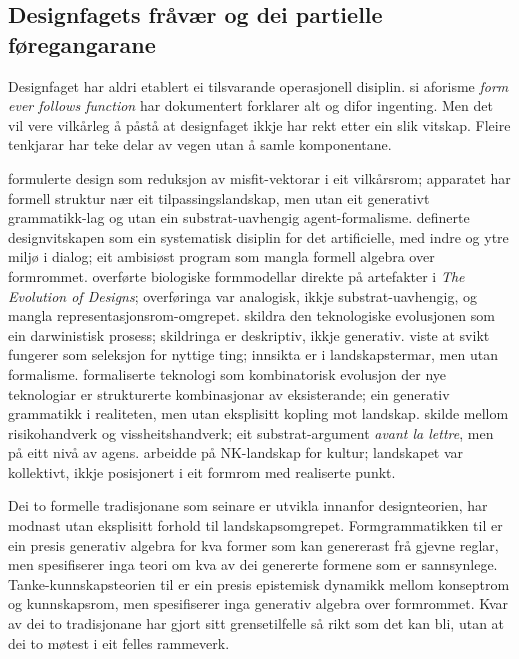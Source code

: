 \documentclass[11pt,a4paper]{article}
\begin{document}
\subsection{Designfagets fråvær og dei partielle føregangarane}

Designfaget har aldri etablert ei tilsvarande operasjonell disiplin. \citet{sullivan1896} si aforisme \textit{form ever follows function} har \citet{michl1995} dokumentert forklarer alt og difor ingenting. Men det vil vere vilkårleg å påstå at designfaget ikkje har rekt etter ein slik vitskap. Fleire tenkjarar har teke delar av vegen utan å samle komponentane.

\citet{alexander1964} formulerte design som reduksjon av misfit-vektorar i eit vilkårsrom; apparatet har formell struktur nær eit tilpassingslandskap, men utan eit generativt grammatikk-lag og utan ein substrat-uavhengig agent-formalisme. \citet{simon1969} definerte designvitskapen som ein systematisk disiplin for det artificielle, med indre og ytre miljø i dialog; eit ambisiøst program som mangla formell algebra over formrommet. \citet{steadman1979} overførte biologiske formmodellar direkte på artefakter i \textit{The Evolution of Designs}; overføringa var ana\-logisk, ikkje substrat-uavhengig, og mangla representasjonsrom-omgrepet. \citet{basalla1988} skildra den teknologiske evolusjonen som ein darwinistisk prosess; skildringa er deskriptiv, ikkje generativ. \citet{petroski1992} viste at svikt fungerer som seleksjon for nyttige ting; innsikta er i landskapstermar, men utan formalisme. \citet{wbarthur2009} formaliserte teknologi som kombinatorisk evolusjon der nye teknologiar er strukturerte kombinasjonar av eksisterande; ein generativ grammatikk i realiteten, men utan eksplisitt kopling mot landskap. \citet{pye1968} skilde mellom risikohandverk og vissheitshandverk; eit substrat-argument \textit{avant la lettre}, men på eitt nivå av agens. \citet{kauffman1993} arbeidde på NK-landskap for kultur; landskapet var kollektivt, ikkje posisjonert i eit formrom med realiserte punkt.

Dei to formelle tradisjonane som seinare er utvikla innanfor designteorien, har modnast utan eksplisitt forhold til landskapsomgrepet. Formgrammatikken til \citet{stinygips1972} er ein presis generativ algebra for kva former som kan genererast frå gjevne reglar, men spesifiserer inga teori om kva av dei genererte formene som er sannsynlege. Tanke-kunnskapsteorien til \citet{hatchuelweil2003, hatchuelweil2009} er ein presis epistemisk dynamikk mellom konseptrom og kunnskapsrom, men spesifiserer inga generativ algebra over formrommet. Kvar av dei to tradisjonane har gjort sitt grensetilfelle så rikt som det kan bli, utan at dei to møtest i eit felles rammeverk.
\end{document}
